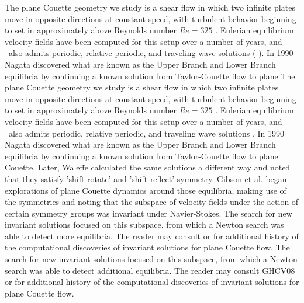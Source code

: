\documentclass[letter,12pt,openany]{article}
\begin{document}
The plane Couette geometry we study is a shear flow in which two infinite plates move in opposite directions at constant speed, with turbulent behavior beginning to set in approximately above Reynolds number $Re=325$ \cite{GHCV08}. 
Eulerian equilibrium velocity fields have been computed for this setup over a number of years, and \pCf\ also admits periodic, relative periodic, and traveling wave solutions (\cite{GHCV08} \cite{DV04}). In 1990 Nagata \cite{N90} discovered what are known as the Upper Branch and Lower Branch equilibria by continuing a known solution from Taylor-Couette flow to plane
The plane Couette geometry we study is a shear flow in which two infinite plates move in opposite directions at constant speed, with turbulent behavior beginning to set in approximately above Reynolds number $Re=325$ \cite{GHCV08}. 
Eulerian equilibrium velocity fields have been computed for this setup over a number of years, and \pCf\ also admits periodic, relative periodic, and traveling wave solutions \cite{GHCV08,DV04}. In 1990 Nagata \cite{N90} discovered what are known as the Upper Branch and Lower Branch equilibria by continuing a known solution from Taylor-Couette flow to plane
Couette. Later, Waleffe \cite{W03}
calculated the same solutions a different way and noted that they
satisfy 'shift-rotate' and 'shift-reflect' symmetry. Gibson et al. \cite{GHCW07} began explorations of plane Couette dynamics around
those equilibria, making use of the symmetries and noting that the subspace of velocity fields under the action of certain symmetry groups was invariant under Navier-Stokes.
The search for new invariant solutions focused on this subspace, from which a Newton search was able to detect more equilibria. The reader may consult \cite{GHCV08} or \cite{GHCW07} for additional history of the computational discoveries of invariant solutions for plane Couette flow.
The search for new invariant solutions focused on this subspace, from which a Newton search was able to detect additional equilibria. The reader may consult \cite{GHCV08}GHCV08 or \cite{GHCW07} for additional history of the computational discoveries of invariant solutions for plane Couette flow.
\end{document}
